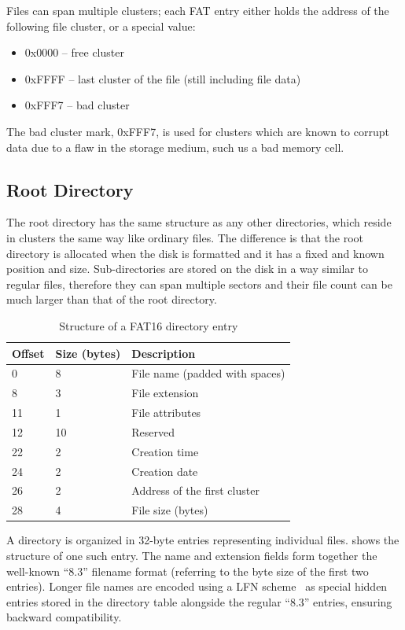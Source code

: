 Files can span multiple clusters; each \gls{FAT} entry either holds the address of the following file cluster, or a special value:

\begin{itemize}[nosep]
	\item 0x0000 -- free cluster
	\item 0xFFFF -- last cluster of the file (still including file data)
	\item 0xFFF7 -- bad cluster
\end{itemize}

The bad cluster mark, 0xFFF7, is used for clusters which are known to corrupt data due to a flaw in the storage medium, such us a bad memory cell.

\subsection{Root Directory}

The root directory has the same structure as any other directories, which reside in clusters the same way like ordinary files. The difference is that the root directory is allocated when the disk is formatted and it has a fixed and known position and size. Sub-directories are stored on the disk in a way similar to regular files, therefore they can span multiple sectors and their file count can be much larger than that of the root directory.

\begin{table}
	\centering
	\begin{tabular}{lll}
		\toprule
		\textbf{Offset} & \textbf{Size (bytes)}  & \textbf{Description}\\
		\midrule
		0 & 8 & File name (padded with spaces) \\
		8 & 3 & File extension \\
		11 & 1 & File attributes \\
		12 & 10 & Reserved \\
		22 & 2 & Creation time \\
		24 & 2 & Creation date \\
		26 & 2 & Address of the first cluster \\
		28 & 4 & File size (bytes) \\
		\bottomrule
	\end{tabular}
	\caption{\label{tab:fat16-dir-entry}Structure of a FAT16 directory entry}
\end{table}

A directory is organized in 32-byte entries representing individual files.  shows the structure of one such entry. The name and extension fields form together the well-known ``8.3'' filename format (referring to the byte size of the first two entries). Longer file names are encoded using a \gls{LFN} scheme~\cite{fat-lfn} as special hidden entries stored in the directory table alongside the regular ``8.3'' entries, ensuring backward compatibility.

